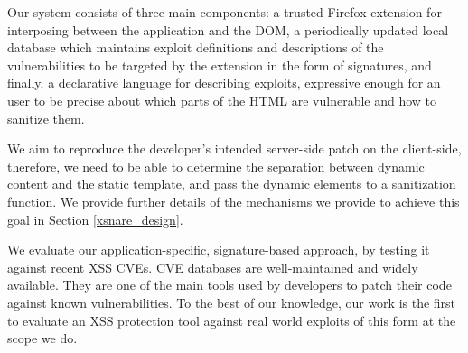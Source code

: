  Our system consists of three main components: a trusted Firefox extension for interposing between the application and the DOM, a periodically updated local database which maintains exploit definitions and descriptions of the vulnerabilities to be targeted by the extension in the form of signatures, and finally, a declarative language for describing exploits, expressive enough for an user to be precise about which parts of the HTML are vulnerable and how to sanitize them.
 
 We aim to reproduce the developer's intended server-side patch on the client-side, therefore, we need to be able to determine the separation between dynamic content and the static template, and pass the dynamic elements to a sanitization function. We provide further details of the mechanisms we provide to achieve this goal in Section \ref{xsnare_design}.
 
 We evaluate our application-specific, signature-based approach, by testing it against recent XSS CVEs. CVE databases are well-maintained and widely available. They are one of the main tools used by developers to patch their code against known vulnerabilities. To the best of our knowledge, our work is the first to evaluate an XSS protection tool against real world exploits of this form at the scope we do.


